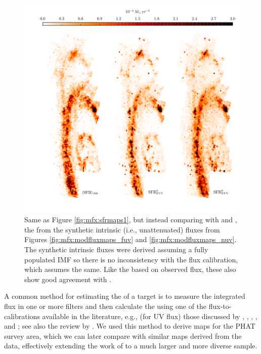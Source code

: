 \documentclass[iop, tighten]{emulateapj}
\begin{document}
\begin{figure}
\centering
\includegraphics[width=\textwidth]{m31flux-figures/sfrmaps2.pdf}
\caption[\sfr{} maps from estimates based on synthetic intrinsic fluxes
compared with the mean \sfr{} map from the .]{Same as Figure
    \ref{fig:mfx:sfrmaps1}, but instead comparing \sfroneh{} with \sfrfuvz{}
    and \sfrnuvz{}, the  from the synthetic intrinsic (i.e.,
    unattenuated) fluxes from Figures \ref{fig:mfx:modfluxmaps_fuv} and
    \ref{fig:mfx:modfluxmaps_nuv}. The synthetic intrinsic fluxes were derived
    assuming a fully populated IMF so there is no inconsistency with the flux
    calibration, which assumes the same. Like the  based on observed
    flux, these  also show good agreement with \sfroneh{}.
}
\label{fig:mfx:sfrmaps2}
\end{figure}


A common method for estimating the \sfr{} of a target is to measure the
integrated flux in one or more filters and then calculate the \sfr{} using one
of the flux-to-\sfr{} calibrations available in the literature, e.g., (for UV
flux) those discussed by \citet{Kennicutt:1998}, \citet{Salim:2007},
\citet{Hao:2011}, \citet{Murphy:2011}, and \citet{Leroy:2012}; see also the
review by \citet{Kennicutt:2012}. We used this method to derive \sfr{} maps for
the PHAT survey area, which we can later compare with similar maps derived from
the \citet{Lewis:2014} \sfh{} data, effectively extending the work of
\citet{Simones:2014} to a much larger and more diverse sample.
\end{document}
